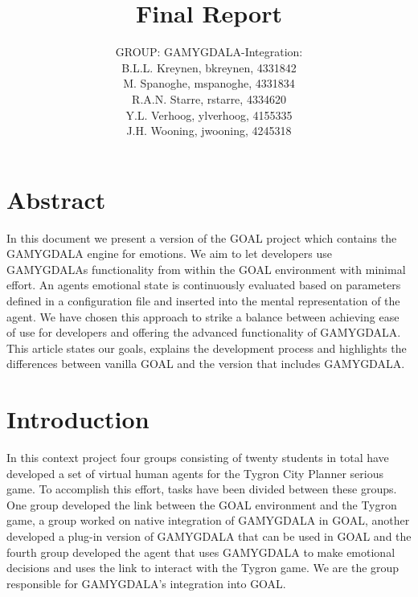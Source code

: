 \documentclass[11pt]{article}
\title{Final Report}
\author{GROUP: GAMYGDALA-Integration:\\
	B.L.L. Kreynen, bkreynen, 4331842\\
	M. Spanoghe, mspanoghe, 4331834\\
	R.A.N. Starre, rstarre, 4334620\\
	Y.L. Verhoog, ylverhoog, 4155335\\
	J.H. Wooning, jwooning, 4245318\\
}
\begin{document}
\maketitle
\pagebreak
\tableofcontents
\pagebreak

\section{Abstract}
In this document we present a version of the GOAL project which contains the GAMYGDALA engine for emotions. We aim to let developers use GAMYGDALAs functionality from within the GOAL environment with minimal effort. An agents emotional state is continuously evaluated based on parameters defined in a configuration file and inserted into the mental representation of the agent. We have chosen this approach to strike a balance between achieving ease of use for developers and offering the advanced functionality of GAMYGDALA. This article states our goals, explains the development process and highlights the differences between vanilla GOAL and the version that includes GAMYGDALA.

\clearpage

\section{Introduction}
In this context project four groups consisting of twenty students in total have developed a set of virtual human \gls{agent}s for the Tygron\cite{Tygron} City Planner serious game. To accomplish this effort, tasks have been divided between these groups. One group developed the link between the \gls{GOAL}\cite{GOAL} environment and the Tygron game, a group worked on native integration of \gls{GAMYGDALA}\cite{GAMYGDALA} in GOAL, another developed a plug-in version of GAMYGDALA that can be used in GOAL and the fourth group developed the agent that uses GAMYGDALA to make emotional decisions and uses the link to interact with the Tygron game. We are the group responsible for GAMYGDALA's integration into GOAL. 
\end{document}
